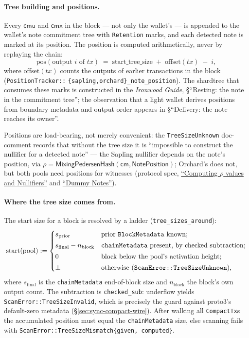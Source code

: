 \documentclass[11pt,a4paper]{article}
\theoremstyle{definition}
\newcommand{\cmsym}{\mathsf{cm}}
\newcommand{\cmx}{\mathsf{cmx}}
\begin{document}
\paragraph{Tree building and positions.} Every $\mathsf{cmu}$ and $\cmx$ in
the block --- not only the wallet's --- is appended to the wallet's note
commitment tree with \texttt{Retention} marks, and each detected note is
marked at its position. The position is computed
arithmetically, never by replaying the chain:
\[
\mathrm{pos}(\text{output } i \text{ of } tx)
  \;=\; \mathrm{start\_tree\_size} \;+\; \mathrm{offset}(tx) \;+\; i,
\]
where $\mathrm{offset}(tx)$ counts the outputs of earlier transactions in
the block (\texttt{PositionTracker::}\allowbreak%
\texttt{\{sapling,orchard\}\_note\_position}). The
shardtree that consumes these marks is constructed in the \emph{Ironwood
Guide}, \S``Resting: the note in the commitment tree''; the observation that a
light wallet derives positions from boundary metadata and output order
appears in \S``Delivery: the note reaches its owner''.

Positions are load-bearing, not merely convenient: the
\texttt{TreeSizeUnknown} doc-comment records that without the tree size it
is ``impossible to construct the nullifier for a detected note'' --- the
Sapling nullifier depends on the note's position, via $\rho =
\mathsf{MixingPedersenHash}(\cmsym, \mathsf{NotePosition})$; Orchard's does
not, but both pools need positions for witnesses
(protocol spec, \href{https://zips.z.cash/protocol/protocol.pdf\#rhoandnullifiers}{``Computing $\rho$ values and Nullifiers''} and \href{https://zips.z.cash/protocol/protocol.pdf\#dummynotes}{``Dummy
Notes''}).

\paragraph{Where the tree size comes from.} The start size for a block is
resolved by a ladder (\texttt{tree\_sizes\_\allowbreak around}):
\[
\mathrm{start}(\mathrm{pool}) :=
\begin{cases}
s_{\mathrm{prior}} & \text{prior \texttt{BlockMetadata} known;}\\[2pt]
s_{\mathrm{final}} - n_{\mathrm{block}} &
  \text{\texttt{chainMetadata} present, by checked subtraction;}\\[2pt]
0 & \text{block below the pool's activation height;}\\[2pt]
\bot & \text{otherwise (\texttt{ScanError::TreeSizeUnknown}),}
\end{cases}
\]
where $s_{\mathrm{final}}$ is the \texttt{chainMetadata} end-of-block size
and $n_{\mathrm{block}}$ the block's own output count. The subtraction is
\texttt{checked\_sub}: underflow yields
\texttt{ScanError::TreeSizeInvalid}, which is precisely the guard against
proto3's default-zero metadata (\S\ref{sec:sync-compact-wire}). After
walking all \texttt{CompactTx}s the accumulated position must equal the
\texttt{chainMetadata} size, else scanning fails with
\texttt{ScanError::}\allowbreak\texttt{TreeSizeMismatch\{given, computed\}}.
\end{document}
